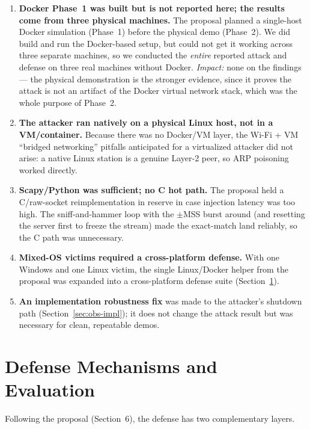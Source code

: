 \documentclass[11pt,a4paper]{article}
\newcommand{\code}[1]{\texttt{\detokenize{#1}}}
\begin{document}
\begin{enumerate}[leftmargin=1.4em,itemsep=4pt]
  \item \textbf{Docker Phase~1 was built but is not reported here; the results
        come from three physical machines.} The proposal planned a single-host
        Docker simulation (Phase~1) before the physical demo (Phase~2). We did
        build and run the Docker-based setup, but could not get it working across
        three separate machines, so we conducted the \emph{entire} reported attack
        and defense on three real machines without Docker. \emph{Impact:} none on
        the findings --- the physical demonstration is the stronger evidence,
        since it proves the attack is not an artifact of the Docker virtual
        network stack, which was the whole purpose of Phase~2.
  \item \textbf{The attacker ran natively on a physical Linux host, not in a
        VM/container.} Because there was no Docker/VM layer, the Wi-Fi + VM
        ``bridged networking'' pitfalls anticipated for a virtualized attacker
        did not arise: a native Linux station is a genuine Layer-2 peer, so ARP
        poisoning worked directly.
  \item \textbf{Scapy/Python was sufficient; no C hot path.} The proposal held a
        C/raw-socket reimplementation in reserve in case injection latency was
        too high. The sniff-and-hammer loop with the $\pm$MSS burst around
        \code{RCV.NXT} (and resetting the server first to freeze the stream) made
        the exact-match land reliably, so the C path was unnecessary.
  \item \textbf{Mixed-OS victims required a cross-platform defense.} With one
        Windows and one Linux victim, the single Linux/Docker helper from the
        proposal was expanded into a cross-platform defense suite
        (Section~\ref{sec:defense}).
  \item \textbf{An implementation robustness fix} was made to the attacker's
        shutdown path (Section~\ref{sec:obs-impl}); it does not change the attack
        result but was necessary for clean, repeatable demos.
\end{enumerate}

\section{Defense Mechanisms and Evaluation}
\label{sec:defense}
Following the proposal (Section~6), the defense has two complementary layers.
\end{document}
